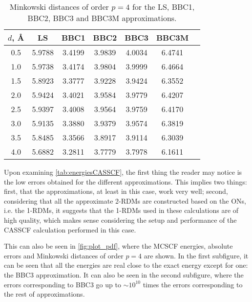     \begin{table}[b!]
        \caption{Minkowski distances of order $p = 4$ for the LS, BBC1, BBC2, BBC3
        and BBC3M approximations.}
        \label{tab:minkowski}
        \centering
        \begin{tabular}{@{}ccccccc@{}}
            \toprule
            $d$, \AA    & LS       & BBC1     & BBC2     & BBC3     & BBC3M    \\
            \midrule
            0.5   & 5.9788   & 3.4199   & 3.9839   & 4.0034   & 6.4741   \\
            1.0   & 5.9738   & 3.4174   & 3.9804   & 3.9999   & 6.4664   \\
            1.5   & 5.8923   & 3.3777   & 3.9228   & 3.9424   & 6.3552   \\
            2.0   & 5.9424   & 3.4021   & 3.9584   & 3.9779   & 6.4207   \\
            2.5   & 5.9397   & 3.4008   & 3.9564   & 3.9759   & 6.4170   \\
            3.0   & 5.9135   & 3.3880   & 3.9379   & 3.9574   & 6.3819   \\
            3.5   & 5.8485   & 3.3566   & 3.8917   & 3.9114   & 6.3039   \\
            4.0   & 5.6882   & 3.2811   & 3.7779   & 3.7978   & 6.1611   \\
            \bottomrule
        \end{tabular}
    \end{table}

    Upon examining \cref{tab:energiesCASSCF}, the first thing the reader may notice
    is the low errors obtained for the different approximations.
    This implies two things: first, that the approximations, at least in this case,
    work very well; second, considering that all the approximate 2-RDMs are
    constructed based on the ONs, i.e. the 1-RDMs, it suggests that the 1-RDMs
    used in these calculations are of high quality, which makes sense considering
    the setup and performance of the CASSCF calculation performed in this case.

    This can also be seen in \cref{fig:plot_pdf}, where the MCSCF energies, absolute
    errors and Minkowski distances of order $p=4$ are shown.
    In the first subfigure, it can be seen that all the energies are real close to
    the exact energy except for one: the BBC3 approximation.
    It can also be seen in the second subfigure, where the errors corresponding
    to BBC3 go up to $\sim 10^{10}$ times the errors corresponding to the rest
    of approximations.

